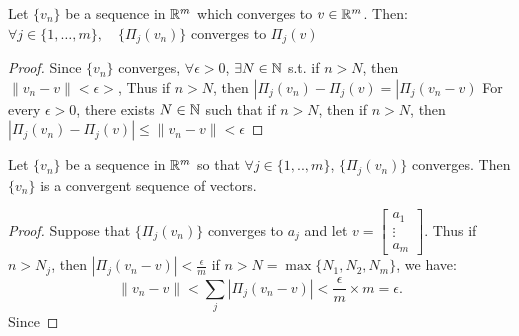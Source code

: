 \documentclass[../main/main.tex]{subfiles}
\begin{document}
\begin{lemma}
    Let $ \{v_n\} $ be a sequence in $ \mathbb{R}^{m}$ which converges to $v\in \mathbb{R}^{m}$. Then: $
        \forall j \in  \{ 1,\ldots,m\}, \quad \{ \Pi_j(v_n)\}   
    $ converges to $\Pi_j(v)$
\end{lemma}
\begin{proof}
    Since $\{v_n\} $ converges, $\forall \epsilon>0$, $\exists N\in \mathbb{N}$ s.t. if $n>N$, then $ \|v_n-v\|<\epsilon>$, Thus if $n>N$, then $|\Pi_j(v_n)-\Pi_j(v) = |\Pi_j(v_n-v)$
    For every $\epsilon>0$, there exists $N\in \mathbb{N}$ such that if $n>N$, then 
    if $n>N$, then $|\Pi_j(v_n) - \Pi_j(v)|\le \|v_n-v\| < \epsilon$
\end{proof}
\begin{lemma}
    Let $ \{v_n\} $ be a sequence in $ \mathbb{R}^{m}$ so that $ \forall j\in \{1,..,m\} $, $\{\Pi_j(v_n)\} $ converges. Then $\{v_n\} $ is a convergent sequence of vectors. 
\end{lemma}
\begin{proof}
    Suppose that $ \{\Pi_j(v_n)\} $ converges to $a_j$ and let  $v = \begin{bmatrix} a_1 \\ \vdots \\ a_m\end{bmatrix} $. Thus if $n>N_j$, then  $|\Pi_j(v_n-v)|<\frac{\epsilon}{m}$
    if  $n>N = \max \{N_1,N_2, N_m\}  $, we have: \[
        \|v_n-v\| < \sum_{j} |\Pi_j(v_n-v)| < \frac{\epsilon}{m} \times  m = \epsilon
    .\]  
    Since 
\end{proof}
       
\end{document}
